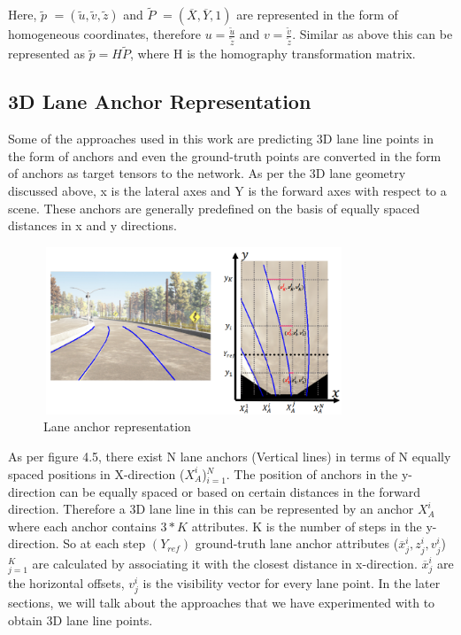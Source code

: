     Here, \textbf{$\widetilde{p}$} $= (\widetilde{u}, \widetilde{v}, \widetilde{z})$ and  \textbf{$\widetilde{P}$} $= (\overline{X},\overline{Y},1 )$ are represented in the form of homogeneous coordinates, therefore $u = \frac{\widetilde{u}} {\widetilde{z}} $ and $v = \frac{\widetilde{v}} {\widetilde{z}} $. Similar as above this can be represented as \textbf{$\widetilde{p} = H\widetilde{P}$}, where H is the homography transformation matrix. 
    
     \subsection{3D Lane Anchor Representation}
    Some of the approaches used in this work are predicting 3D lane line points in the form of anchors and even the ground-truth points are converted in the form of anchors as target tensors to the network.  As per the 3D lane geometry discussed above, x is the lateral axes and Y is the forward axes with respect to a scene. These anchors are generally predefined on the basis of equally spaced distances in x and y directions. 
    
     \begin{figure}[h]
    \centering
    \includegraphics[width=9cm, height=5cm]{images/anchor_3Dlane.png}
    \caption{Lane anchor representation \cite{guo2020gen}}
    \end{figure}
    
    As per figure 4.5, there exist N lane anchors (Vertical lines) in terms of N equally spaced positions in X-direction ($X^{i}_{A}$)$^{N}_{i=1}$. The position of anchors in the y-direction can be equally spaced or based on certain distances in the forward direction. Therefore a 3D lane line in this can be represented by an anchor $X^{i}_{A}$ where each anchor contains $3*K$ attributes. K is the number of steps in the y-direction. So at each step $(Y_{ref})$ ground-truth lane anchor attributes ($\overline{x}^{i}_{j},z^{i}_{j},v^{i}_{j}$)$^{K}_{j=1}$ are calculated by associating it with the closest distance in x-direction. $\overline{x}^{i}_{j}$ are the horizontal offsets, $v^{i}_{j}$ is the visibility vector for every lane point.  In the later sections, we will talk about the approaches that we have experimented with to obtain 3D lane line points. 
        
